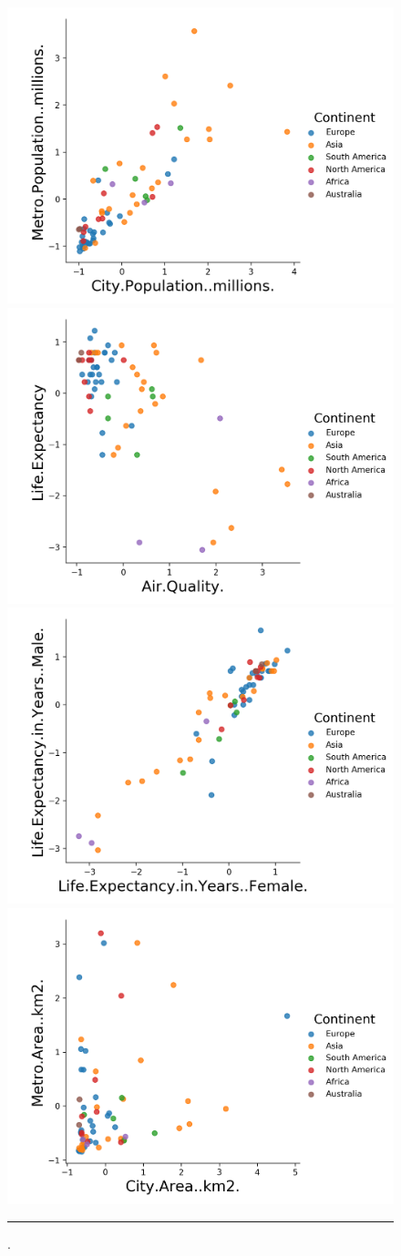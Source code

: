 \begin{figure}[t]
    \centering
    \includegraphics[width=.40\textwidth]{ADOA/Images/CityPopu.png}
    \includegraphics[width=.4\textwidth]{ADOA/Images/AirquaLifeExp.png}
    \includegraphics[width=.4\textwidth]{ADOA/Images/LifeExpMaleFemale.png} %
    \includegraphics[width=.4\textwidth]{ADOA/Images/CityAreaMetro.png} 
    \caption{.}\hrule
    \label{fig:Citiesb}
\end{figure}

